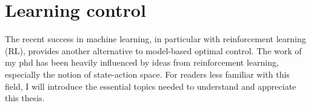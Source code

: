 \section{Learning control}

The recent success in machine learning, in particular with reinforcement learning (RL), provides another alternative to model-based optimal control. The work of my phd has been heavily influenced by ideas from reinforcement learning, especially the notion of state-action space. For readers less familiar with this field, I will introduce the essential topics needed to understand and appreciate this thesis.


